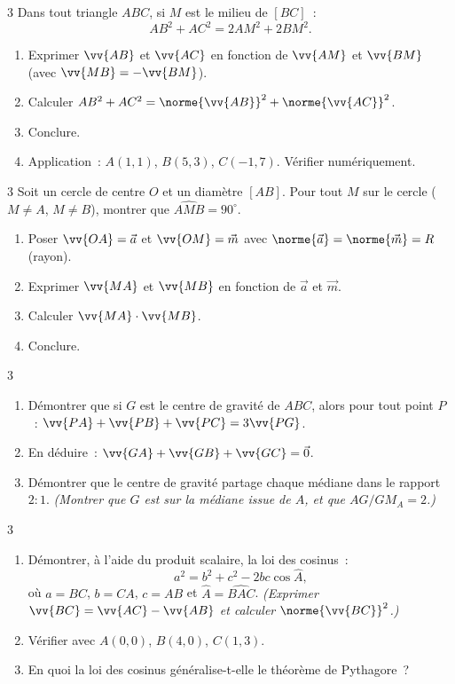 \begin{exo}{3}
Dans tout triangle $ABC$, si $M$ est le milieu de $[BC]$~:
$$AB^2 + AC^2 = 2AM^2 + 2BM^2.$$
\begin{enumerate}
  \item Exprimer $\vv{AB}$ et $\vv{AC}$ en fonction de $\vv{AM}$
        et $\vv{BM}$ (avec $\vv{MB}=-\vv{BM}$).
  \item Calculer $AB^2+AC^2 = \norme{\vv{AB}}^2+\norme{\vv{AC}}^2$.
  \item Conclure.
  \item Application~: $A(1,1)$, $B(5,3)$, $C(-1,7)$.
        V\'erifier num\'eriquement.
\end{enumerate}
\end{exo}

\begin{exo}{3}
Soit un cercle de centre $O$ et un diam\`etre $[AB]$. Pour tout $M$
sur le cercle ($M\ne A$, $M\ne B$), montrer que $\widehat{AMB} = 90^{\circ}$.
\begin{enumerate}
  \item Poser $\vv{OA}=\vec{a}$ et $\vv{OM}=\vec{m}$
        avec $\norme{\vec{a}}=\norme{\vec{m}}=R$ (rayon).
  \item Exprimer $\vv{MA}$ et $\vv{MB}$ en fonction de $\vec{a}$ et $\vec{m}$.
  \item Calculer $\vv{MA}\cdot\vv{MB}$.
  \item Conclure.
\end{enumerate}
\end{exo}

\begin{exo}{3}
\begin{enumerate}
  \item D\'emontrer que si $G$ est le centre de gravité de $ABC$, alors pour tout
        point $P$~: $\vv{PA}+\vv{PB}+\vv{PC} = 3\vv{PG}$.
  \item En d\'eduire~: $\vv{GA}+\vv{GB}+\vv{GC}=\vec{0}$.
  \item D\'emontrer que le centre de gravité partage chaque m\'ediane dans le rapport $2:1$.
        \emph{(Montrer que $G$ est sur la m\'ediane issue de $A$, et que $AG/GM_A=2$.)}
\end{enumerate}
\end{exo}

\begin{exo}{3}
\begin{enumerate}
  \item D\'emontrer, \`a l'aide du produit scalaire, la loi des cosinus~:
        $$a^2 = b^2 + c^2 - 2bc\cos\widehat{A},$$
        o\`u $a=BC$, $b=CA$, $c=AB$ et $\widehat{A}=\widehat{BAC}$.
        \emph{(Exprimer $\vv{BC}=\vv{AC}-\vv{AB}$ et calculer $\norme{\vv{BC}}^2$.)}
  \item V\'erifier avec $A(0,0)$, $B(4,0)$, $C(1,3)$.
  \item En quoi la loi des cosinus g\'en\'eralise-t-elle le th\'eor\`eme de Pythagore~?
\end{enumerate}
\end{exo}

